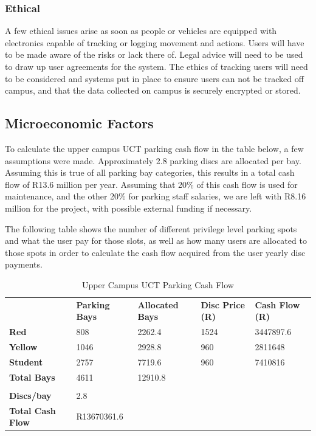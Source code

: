 \subsubsection{Ethical}
A few ethical issues arise as soon as people or vehicles are equipped with electronics capable of tracking or logging movement and actions. Users will have to be made aware of the risks or lack there of. Legal advice will need to be used to draw up user agreements for the system. The ethics of tracking users will need to be considered and systems put in place to ensure users can not be tracked off campus, and that the data collected on campus is securely encrypted or stored.

\newpage
\subsection{Microeconomic Factors}
To calculate the upper campus UCT parking cash flow in the table below, a few assumptions were made. Approximately 2.8 parking discs are allocated per bay. Assuming this is true of all parking bay categories, this results in a total cash flow of R13.6 million per year. Assuming that 20\% of this cash flow is used for maintenance, and the other 20\% for parking staff salaries, we are left with R8.16 million for the project, with possible external funding if necessary.

The following table shows the number of different privilege level parking spots  and what the user pay for those slots, as well as how many users are allocated to those spots in order to calculate the cash flow acquired from the user yearly disc payments.

\begin{table}[H]
\centering
\caption{Upper Campus UCT Parking Cash Flow}
\label{cash-flow}
\begin{tabular}{lllll}
                         & \textbf{Parking Bays} & \textbf{Allocated Bays} & \textbf{Disc Price (R)} & \textbf{Cash Flow (R)} \\
\textbf{Red}                      & 808                   & 2262.4                  & 1524                & 3447897.6          \\
\textbf{Yellow}          & 1046                  & 2928.8                  & 960                 & 2811648            \\
\textbf{Student}         & 2757                  & 7719.6                  & 960                 & 7410816            \\
\textbf{Total Bays}      & 4611                  & 12910.8                 &                     &                    \\
\textbf{}                &                       &                         &                     &                    \\
\textbf{Discs/bay}       & 2.8                   &                         &                     &                    \\
\textbf{Total Cash Flow} & R13670361.6            &                         &                     &                   
\end{tabular}
\end{table}

